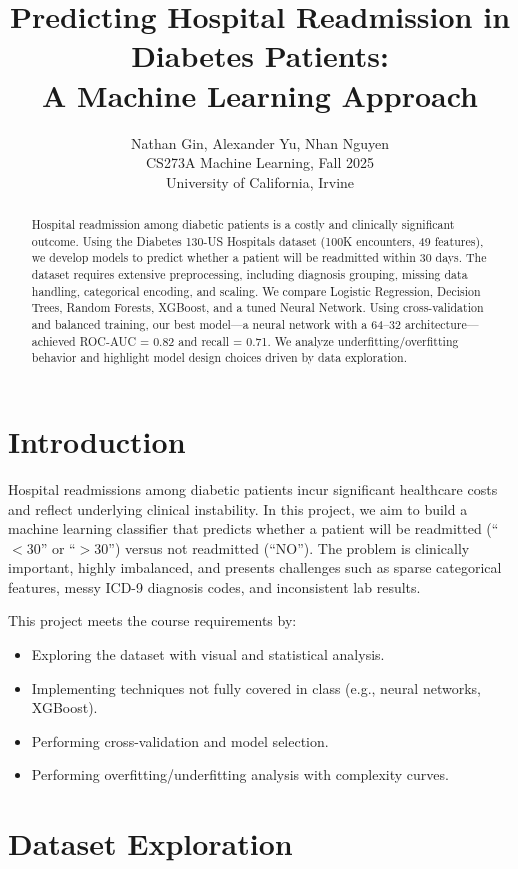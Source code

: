 \documentclass[11pt]{article}
\title{\textbf{Predicting Hospital Readmission in Diabetes Patients: \\ 
A Machine Learning Approach}}
\author{Nathan Gin, Alexander Yu, Nhan Nguyen \\
CS273A Machine Learning, Fall 2025 \\
University of California, Irvine}
\date{}
\begin{document}
\maketitle

\begin{abstract}
Hospital readmission among diabetic patients is a costly and clinically significant outcome. 
Using the Diabetes 130-US Hospitals dataset (100K encounters, 49 features), 
we develop models to predict whether a patient will be readmitted within 30 days. 
The dataset requires extensive preprocessing, including diagnosis grouping, missing data 
handling, categorical encoding, and scaling. 
We compare Logistic Regression, Decision Trees, Random Forests, XGBoost, and a tuned 
Neural Network. 
Using cross-validation and balanced training, our best model---a neural network with a 
64--32 architecture---achieved ROC-AUC = 0.82 and recall = 0.71. 
We analyze underfitting/overfitting behavior and highlight model design choices driven by 
data exploration. 
\end{abstract}

\section{Introduction}

Hospital readmissions among diabetic patients incur significant healthcare costs and 
reflect underlying clinical instability. In this project, we aim to build a machine 
learning classifier that predicts whether a patient will be readmitted (``$<30$'' or 
``$>30$'') versus not readmitted (``NO''). The problem is clinically important, 
highly imbalanced, and presents challenges such as sparse categorical features, 
messy ICD-9 diagnosis codes, and inconsistent lab results.

This project meets the course requirements by:
\begin{itemize}
    \item Exploring the dataset with visual and statistical analysis.
    \item Implementing techniques not fully covered in class (e.g., neural networks, XGBoost).
    \item Performing cross-validation and model selection.
    \item Performing overfitting/underfitting analysis with complexity curves.
\end{itemize}

\section{Dataset Exploration}
\end{document}
